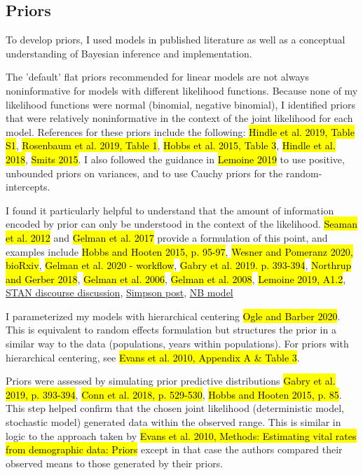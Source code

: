 \documentclass[12pt, oneside, titlepage]{article}   	%
\begin{document}
\subsection*{Priors}


To develop priors, I used models in published literature as well as a conceptual understanding of Bayesian inference and implementation.

The 'default' flat priors recommended for linear models are not always noninformative for models with different likelihood functions. Because none of my likelihood functions were normal (binomial, negative binomial), I identified priors that were relatively noninformative in the context of the joint likelihood for each model. References for these priors include the following: \hl{Hindle et al. 2019, Table S1}, \hl{Rosenbaum et al. 2019, Table 1}, \hl{Hobbs et al. 2015, Table 3}, \hl{Hindle et al. 2018}, \hl{Smits 2015}. I also followed the guidance in \hl{Lemoine 2019} to use positive, unbounded priors on variances, and to use Cauchy priors for the random-intercepts. 

I found it particularly helpful to understand that the amount of information encoded by prior can only be understood in the context of the likelihood. \hl{Seaman et al. 2012} and \hl{Gelman et al. 2017} provide a formulation of this point, and examples include \hl{Hobbs and Hooten 2015, p. 95-97}, \hl{Wesner and Pomeranz 2020, bioRxiv}, \hl{Gelman et al. 2020 - workflow}, \hl{Gabry et al. 2019. p. 393-394}, \hl{Northrup and Gerber 2018}, \hl{Gelman et al. 2006}, \hl{Gelman et al. 2008}, \hl{Lemoine 2019, A1.2}, \href{https://discourse.mc-stan.org/t/choosing-weakly-informative-priors-for-population-level-effects-in-a-poisson-glmm/18008/5}{STAN discourse discussion}, \href{https://statmodeling.stat.columbia.edu/2018/09/12/against-arianism-2-arianism-grande/}{Simpson post}, \href{https://www.flutterbys.com.au/stats/tut/tut10.6b.html#h4_47}{NB model}

I parameterized my models with hierarchical centering \hl{Ogle and Barber 2020}. This is equivalent to random effects formulation but structures the prior in a similar way to the data (populations, years within populations). For priors with hierarchical centering, see \hl{Evans et al. 2010, Appendix A \& Table 3}.

Priors were assessed by simulating prior predictive distributions \hl{Gabry et al. 2019, p. 393-394}, \hl{Conn et al. 2018, p. 529-530}, \hl{Hobbs and Hooten 2015, p. 85}. This step helped confirm that the chosen joint likelihood (deterministic model, stochastic model) generated data within the observed range. This is similar in logic to the approach taken by \hl{Evans et al. 2010, Methods: Estimating vital rates from demographic data: Priors} except in that case the authors compared their observed means to those generated by their priors.
\end{document}
